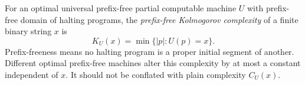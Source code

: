 
For an optimal universal prefix-free partial computable machine $U$ with prefix-free domain of halting programs, the \emph{prefix-free Kolmogorov complexity} of a finite binary string $x$ is
\[
K_U(x)=\min\{|p|:U(p)=x\}.
\]
Prefix-freeness means no halting program is a proper initial segment of another. Different optimal prefix-free machines alter this complexity by at most a constant independent of $x$. It should not be conflated with plain complexity $C_U(x)$.
